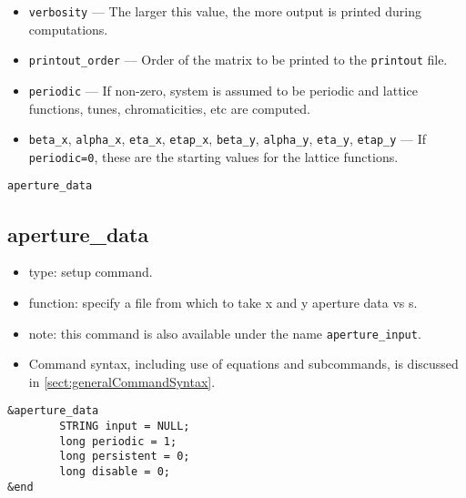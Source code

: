 \documentclass[11pt]{article}
\begin{document}
\begin{itemize}
\item \verb|verbosity| --- The larger this value, the more output is printed during computations.
\item \verb|printout_order| --- Order of the matrix to be printed to the \verb|printout| file.
\item \verb|periodic| --- If non-zero, system is assumed to be periodic and lattice functions, tunes, chromaticities, etc are computed.
\item \verb|beta_x|, \verb|alpha_x|, \verb|eta_x|, \verb|etap_x|, \verb|beta_y|, \verb|alpha_y|, \verb|eta_y|, \verb|etap_y| ---
  If \verb|periodic=0|, these are the starting values for the lattice functions.
\end{itemize}

\newpage
\begin{center}{\Large\verb|aperture_data|}\end{center}
\subsection{aperture\_data \label{subsec:aperturedata}}

\begin{itemize}
\item type: setup command.
\item function: specify a file from which to take x and y aperture data vs s.
\item note: this command is also available under the name \verb|aperture_input|.
\item Command syntax, including use of equations and subcommands, is discussed in \ref{sect:generalCommandSyntax}.
\end{itemize}

\begin{verbatim}
&aperture_data
        STRING input = NULL;
        long periodic = 1; 
        long persistent = 0;
        long disable = 0;
&end
\end{verbatim}
\end{document}
